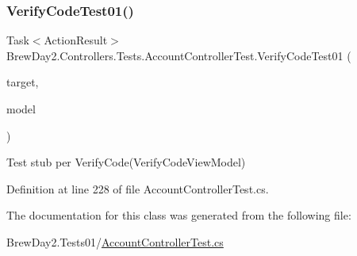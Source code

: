 \subsubsection{\texorpdfstring{Verify\+Code\+Test01()}{VerifyCodeTest01()}}
{\footnotesize\ttfamily Task$<$Action\+Result$>$ Brew\+Day2.\+Controllers.\+Tests.\+Account\+Controller\+Test.\+Verify\+Code\+Test01 (\begin{DoxyParamCaption}\item[{\mbox{[}\+Pex\+Assume\+Under\+Test\mbox{]} \mbox{\hyperlink{class_brew_day2_1_1_controllers_1_1_account_controller}{Account\+Controller}}}]{target,  }\item[{\mbox{\hyperlink{class_brew_day2_1_1_models_1_1_verify_code_view_model}{Verify\+Code\+View\+Model}}}]{model }\end{DoxyParamCaption})}



Test stub per Verify\+Code(\+Verify\+Code\+View\+Model)



Definition at line 228 of file Account\+Controller\+Test.\+cs.



The documentation for this class was generated from the following file\+:\begin{DoxyCompactItemize}
\item 
Brew\+Day2.\+Tests01/\mbox{\hyperlink{1_2_account_controller_test_8cs}{Account\+Controller\+Test.\+cs}}\end{DoxyCompactItemize}
